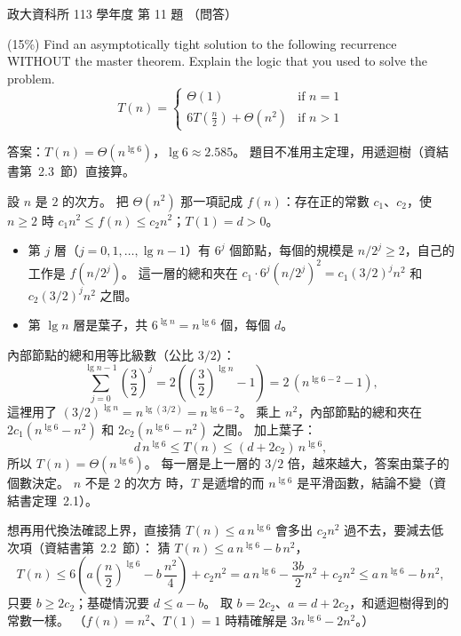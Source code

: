 \begin{pastexam}[label={px:nccu-113-dsa-11}]{政大資科所 113 學年度 第 11 題}
（問答）

(15\%) Find an asymptotically tight solution to the following recurrence WITHOUT the master theorem.
Explain the logic that you used to solve the problem.
\[
T(n)=\begin{cases}\Theta(1) & \text{if } n=1\\ 6T\left(\frac{n}{2}\right)+\Theta(n^2) & \text{if } n>1\end{cases}
\]
\end{pastexam}

\begin{pastsoln}
答案：$T(n) = \Theta(n^{\lg 6})$，$\lg 6 \approx 2.585$。 題目不准用主定理，用遞迴樹（資結書第~2.3~節）直接算。

設 $n$ 是 $2$ 的次方。 把 $\Theta(n^2)$ 那一項記成 $f(n)$：存在正的常數 $c_1$、$c_2$，使 $n \ge 2$ 時
$c_1 n^2 \le f(n) \le c_2 n^2$；$T(1) = d > 0$。
\begin{itemize}
\item 第 $j$ 層（$j = 0, 1, \ldots, \lg n - 1$）有 $6^j$ 個節點，每個的規模是 $n/2^j \ge 2$，自己的工作是
$f(n/2^j)$。 這一層的總和夾在 $c_1 \cdot 6^j (n/2^j)^2 = c_1 (3/2)^j n^2$ 和 $c_2 (3/2)^j n^2$ 之間。
\item 第 $\lg n$ 層是葉子，共 $6^{\lg n} = n^{\lg 6}$ 個，每個 $d$。
\end{itemize}
內部節點的總和用等比級數（公比 $3/2$）：
\[
\sum_{j=0}^{\lg n - 1} \left(\frac{3}{2}\right)^j
= 2\left(\left(\frac{3}{2}\right)^{\lg n} - 1\right) = 2\,(n^{\lg 6 - 2} - 1),
\]
這裡用了 $(3/2)^{\lg n} = n^{\lg (3/2)} = n^{\lg 6 - 2}$。 乘上 $n^2$，內部節點的總和夾在
$2c_1 (n^{\lg 6} - n^2)$ 和 $2c_2 (n^{\lg 6} - n^2)$ 之間。 加上葉子：
\[
d\, n^{\lg 6} \le T(n) \le (d + 2c_2)\, n^{\lg 6} ,
\]
所以 $T(n) = \Theta(n^{\lg 6})$。 每一層是上一層的 $3/2$ 倍，越來越大，答案由葉子的個數決定。 $n$ 不是 $2$ 的次方
時，$T$ 是遞增的而 $n^{\lg 6}$ 是平滑函數，結論不變（資結書定理~2.1）。

想再用代換法確認上界，直接猜 $T(n) \le a\, n^{\lg 6}$ 會多出 $c_2 n^2$ 過不去，要減去低次項（資結書第~2.2~節）：
猜 $T(n) \le a\, n^{\lg 6} - b\, n^2$，
\[
T(n) \le 6\left(a \left(\frac{n}{2}\right)^{\lg 6} - b\, \frac{n^2}{4}\right) + c_2 n^2
= a\, n^{\lg 6} - \frac{3b}{2} n^2 + c_2 n^2 \le a\, n^{\lg 6} - b\, n^2 ,
\]
只要 $b \ge 2c_2$；基礎情況要 $d \le a - b$。 取 $b = 2c_2$、$a = d + 2c_2$，和遞迴樹得到的常數一樣。
（$f(n) = n^2$、$T(1) = 1$ 時精確解是 $3n^{\lg 6} - 2n^2$。）
\end{pastsoln}
